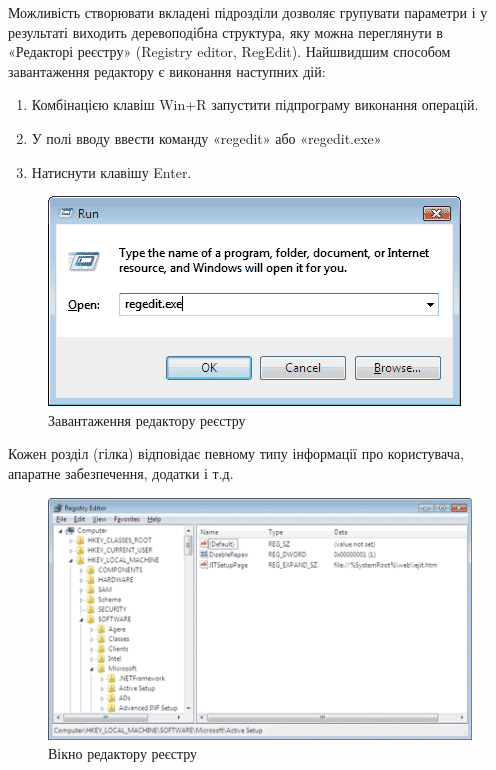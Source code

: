 \documentclass[
	a4paper,
	oneside,
	DIV = 12,
	fontsize = 13pt,
	headings = normal,
]{scrartcl}
\begin{document}
		Можливість створювати вкладені підрозділи дозволяє групувати параметри і у результаті виходить деревоподібна структура, яку можна переглянути в «Редакторі реєстру» (Registry editor, RegEdit). Найшвидшим способом завантаження редактору є виконання наступних дій:
		\begin{enumerate}
			\item Комбінацією клавіш Win+R запустити підпрограму виконання операцій.
			\item У полі вводу ввести команду «regedit» або «regedit.exe»
			\item Натиснути клавішу Enter.
		\end{enumerate}

		\begin{figure}[!htbp]
			\centering
			\includegraphics[height = 7\baselineskip]{./assets/extracted-001.png}
			\caption{Завантаження редактору реєстру}
			\label{}
		\end{figure}

		Кожен розділ (гілка) відповідає певному типу інформації про користувача, апаратне забезпечення, додатки і т.д. 

		\begin{figure}[!htbp]
			\centering
			\includegraphics[height = 10\baselineskip]{./assets/extracted-002.png}
			\caption{Вікно редактору реєстру}
			\label{}
		\end{figure}
\end{document}
